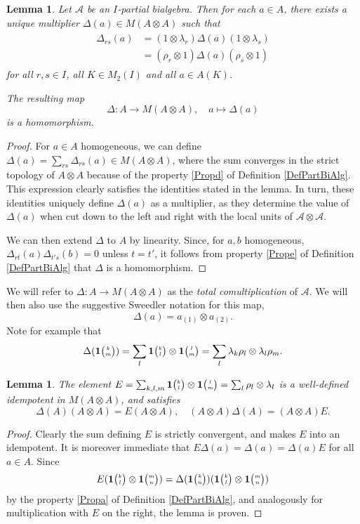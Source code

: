 \documentclass[11pt]{article}
\newcommand{\Grt}[3]{#1{\tiny {\begin{pmatrix} #2\\#3\end{pmatrix}}}}
\newcommand{\UnitC}[2]{\Grt{\mathbf{1}}{#1}{#2}}
\newtheorem{Lem}[Theorem]{Lemma}
\theoremstyle{definition}
\numberwithin{equation}{section}
\begin{document}
\begin{Lem} Let $\mathscr{A}$ be an $I$-partial bialgebra. Then for each $a\in A$, there exists a unique multiplier $\Delta(a) \in M(A\otimes A)$ such that \begin{align}\label{EqDel}
    \begin{aligned}
      \Delta_{rs}(a) &= (1\otimes \lambda_r)\Delta(a)(1\otimes
      \lambda_s) \\ &= (\rho_r\otimes 1)\Delta(a)(\rho_s\otimes 1)
    \end{aligned}
\end{align}  for all $r,s\in I$, all $K\in M_2(I)$ and all $a\in A(K)$. 

The resulting map \[\Delta:A\rightarrow M(A\otimes A),\quad a\mapsto \Delta(a)\] is a homomorphism.
\end{Lem} 
\begin{proof} For $a\in A$ homogeneous, we can define $\Delta(a) = \sum_{rs} \Delta_{rs}(a) \in M(A\otimes A)$, where the sum converges in the strict topology of $A\otimes A$ because of the property \ref{Propd} of Definition \ref{DefPartBiAlg}. This expression clearly satisfies the identities stated in the lemma. In turn, these identities uniquely define $\Delta(a)$ as a multiplier, as they determine the value of $\Delta(a)$ when cut down to the left and right with the local units of $\mathscr{A}\otimes \mathscr{A}$.

We can then extend $\Delta$ to $A$ by linearity. Since, for $a,b$ homogeneous, $\Delta_{rt}(a)\Delta_{t's}(b)=0$ unless $t=t'$, it follows from property \ref{Prope} of Definition \ref{DefPartBiAlg} that $\Delta$ is a homomorphism. 
\end{proof}

We will refer to $\Delta: A\rightarrow M(A\otimes A)$ as the \emph{total comultiplication} of $\mathscr{A}$. We will then also use the suggestive Sweedler notation for this map, \[\Delta(a) = a_{(1)}\otimes a_{(2)}.\] Note for example that \[\Delta(\UnitC{k}{m}) = \sum_{l}\UnitC{k}{l}\otimes \UnitC{l}{m} = \sum_l \lambda_k\rho_l\otimes \lambda_l\rho_m.\]

\begin{Lem} The element $E = \sum_{k,l,m} \UnitC{k}{l}\otimes \UnitC{l}{m}= \sum_l \rho_l\otimes \lambda_l$ is a well-defined idempotent in $M(A\otimes A)$, and satisfies \[\Delta(A)(A\otimes A)=E(A\otimes A),\quad (A\otimes A)\Delta(A)= (A\otimes A)E.\]
\end{Lem} 
\begin{proof} Clearly the sum defining $E$ is strictly convergent, and makes $E$ into an idempotent. It is moreover immediate that $E\Delta(a)=\Delta(a) = \Delta(a)E$ for all $a\in A$. Since \[E(\UnitC{k}{l}\otimes \UnitC{m}{n}) = \Delta(\UnitC{k}{n})(\UnitC{k}{l}\otimes \UnitC{m}{n}) \] by the property \ref{Propa} of Definition \ref{DefPartBiAlg}, and analogously for multiplication with $E$ on the right, the lemma is proven. 
\end{proof} 
\end{document}
